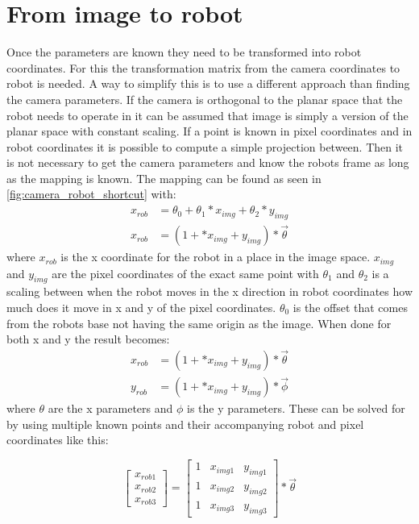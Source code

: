\section{From image to robot}
Once the parameters are known they need to be transformed into robot coordinates. For this the transformation matrix from the camera coordinates to robot is needed. A way to simplify this is to use a different approach than finding the camera parameters. If the camera is orthogonal to the planar space that the robot needs to operate in it can be assumed that image is simply a version of the planar space with constant scaling. If a point is known in pixel coordinates and in robot coordinates it is possible to compute a simple projection between. Then it is not necessary to get the camera parameters and know the robots frame as long as the mapping is known. The mapping can be found as seen in \autoref{fig:camera_robot_shortcut} with:
\begin{equation}
\begin{split}
x_{rob}&=\theta_{0}+\theta_{1}*x_{img}+\theta_{2}*y_{img}\\
x_{rob}&=(1+*x_{img}+y_{img}) * \vec{\theta}
\end{split}
\end{equation}
 where $x_{rob}$ is the x coordinate for the robot in a place in the image space. $x_{img}$ and $y_{img}$ are the pixel coordinates of the exact same point with $\theta_1$ and $\theta_2$ is a scaling between when the robot moves in the x direction in robot coordinates how much does it move in x and y of the pixel coordinates. $\theta_0$ is the offset that comes from the robots base not having the same origin as the image. When done for both x and y the result becomes:
\begin{equation}
\begin{split}
x_{rob}&=(1+*x_{img}+y_{img})*\vec{\theta}\\
y_{rob}&=(1+*x_{img}+y_{img}) * \vec{\phi}
\end{split}
\end{equation}
where $\theta$ are the x parameters and $\phi$ is the y parameters. These can be solved for by using multiple known points and their accompanying robot and pixel coordinates like this:

\begin{equation}
\begin{bmatrix}
x_{rob1} \\
x_{rob2} \\
x_{rob3}
\end{bmatrix} 
 =
\begin{bmatrix}
1 & x_{img1} & y_{img1} \\
1 & x_{img2} & y_{img2} \\
1 & x_{img3} & y_{img3} 
\end{bmatrix}  
* \vec{\theta}
\end{equation}

